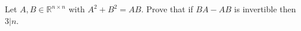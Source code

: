 Let $A,B \in \mathbb{R}^{n\times n}$ with $A^2+B^2=AB$. Prove that if $BA-AB$ is invertible then $3|n$.